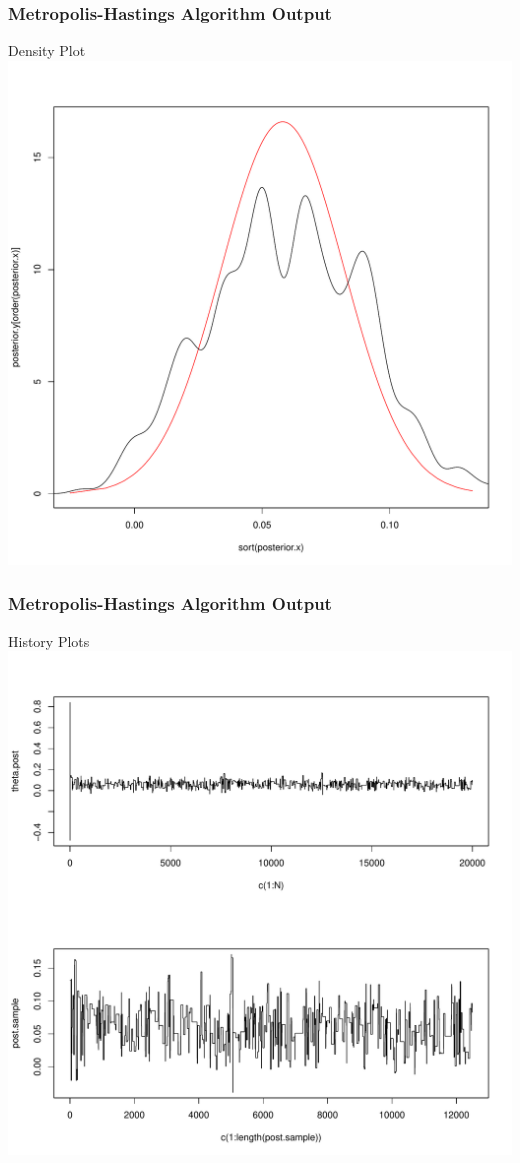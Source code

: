 \documentclass[10pt]{beamer}
\begin{document}
\begin{frame}
\frametitle{Metropolis-Hastings Algorithm Output}
	\begin{center}
	Density Plot\\
	\includegraphics[scale=0.3]{metropolis.pdf}
	\end{center}
\end{frame}

\begin{frame}
\frametitle{Metropolis-Hastings Algorithm Output}
	\begin{center}
	History Plots\\
	\includegraphics[scale=0.3]{history.pdf} 
	\end{center}
\end{frame}
\end{document}
